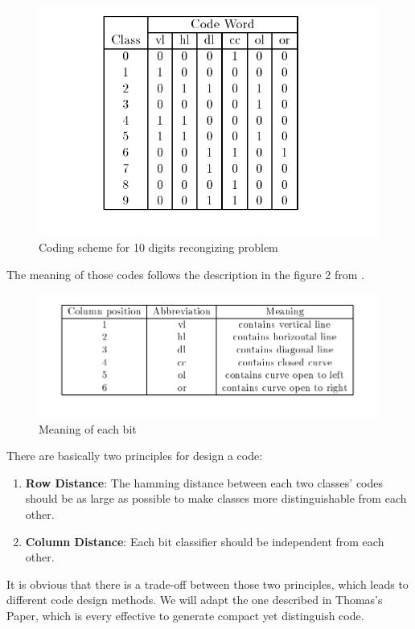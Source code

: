\begin{figure}[!htbp]
\centering
\includegraphics[bb=0 0 680 500,scale=.3]{FIG/code.png} 
\caption{Coding scheme for 10 digits recongizing problem}
\end{figure}

The meaning of those codes follows the description in the figure 2 from \cite{Thomas1995}.


\begin{figure}[!htbp]
\centering
\includegraphics[bb=0 0 860 300,scale=.3]{FIG/meaning.png} 
\caption{Meaning of each bit}
\end{figure}
 
There are basically two principles for design a code\cite{Thomas1995}:
\begin{enumerate}
	\item \textbf{Row Distance}: The hamming distance between each two classes' codes should be as large as possible to make classes more distinguishable from each other.
	\item \textbf{Column Distance}: Each bit classifier should be independent from each other.
\end{enumerate}  

It is obvious that there is a trade-off between those two principles, which leads to different code design methods. We will adapt the one described in Thomas's Paper\cite{Thomas1995}, which is every effective to generate compact yet distinguish code. 

